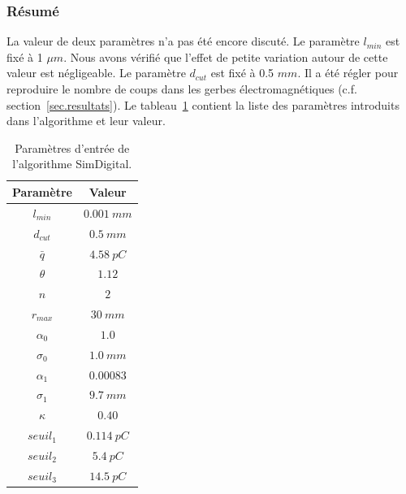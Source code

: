 \subsubsection{Résumé}
La valeur de deux paramètres n'a pas été encore discuté. Le paramètre $l_{min}$ est fixé à 1 $\mu m$. Nous avons vérifié que l'effet de petite variation autour de cette valeur est négligeable. Le paramètre $d_{cut}$ est fixé à 0.5 $mm$. Il a été régler pour reproduire le nombre de coups dans les gerbes électromagnétiques (c.f. section~\ref{sec.resultats}). Le tableau~\ref{tab.summary} contient la liste des paramètres introduits dans l'algorithme et leur valeur.
\begin{table}[!ht]
  \begin{center}
    \begin{tabular}{c||c}
      Paramètre & Valeur \\
      \hline
      \hline
      $l_{min}$ & $0.001\ mm$\\
      $d_{cut}$ & $0.5\ mm$ \\
      \hline
      $\bar q$ & $4.58\ pC$ \\
      $\theta$ & $1.12$ \\ 
      \hline
      $n$ & $2$ \\ 
      $r_{max}$ & $30\ mm$ \\
      $\alpha_0$ & $1.0$ \\
      $\sigma_0$ & $1.0\ mm$ \\
      $\alpha_1$ & $0.00083$ \\
      $\sigma_1$ & $9.7\ mm$ \\
      \hline
      $\kappa$ & $0.40$\\
      \hline 
      $seuil_1$ & $0.114\ pC$\\
      $seuil_2$ & $5.4\ pC$\\
      $seuil_3$ & $14.5\ pC$
    \end{tabular}
  \end{center}  
  \caption{Paramètres d'entrée de l'algorithme SimDigital.}
  \label{tab.summary}
\end{table}

